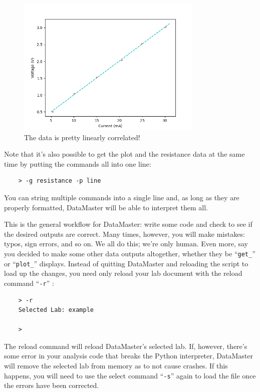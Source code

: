 \documentclass[12pt]{article}
\begin{document}
{\begin{figure}[!ht]
  \centering
    \includegraphics[width=3.5in]{assets/line.png}
  \caption{\textsf{The data is pretty linearly correlated!}}
  \label{fig:ex_line}
\end{figure}

Note that it's also possible to get the plot and the resistance data at the same time by putting the commands all into one line:
\begin{framed}
  \begin{lstlisting}
    > -g resistance -p line
  \end{lstlisting}
\end{framed}
You can string multiple commands into a single line and, as long as they are properly formatted, DataMaster will be able to interpret them all.

This is the general workflow for DataMaster: write some code and check to see if the desired outputs are correct. Many times, however, you will make mistakes: typos, sign errors, and so on. We all do this; we're only human. Even more, say you decided to make some other data outputs altogether, whether they be ``\texttt{get\_}'' or ``\texttt{plot\_}'' displays. Instead of quitting DataMaster and reloading the script to load up the changes, you need only reload your lab document with the reload command ``\texttt{-r}'' : 
\begin{framed}
  \begin{lstlisting}
    > -r
    Selected Lab: example

    > 
  \end{lstlisting}
\end{framed}
The reload command will reload DataMaster's selected lab. If, however, there's some error in your analysis code that breaks the Python interpreter, DataMaster will remove the selected lab from memory as to not cause crashes. If this happens, you will need to use the select command ``\texttt{-s}'' again to load the file once the errors have been corrected.

}
\end{document}
